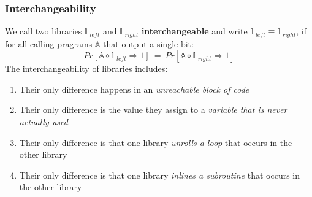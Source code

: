\documentclass{article}
\begin{document}
\begin{adjustwidth}{2em}{}
\begin{adjustwidth}{2em}{}
				\subsubsection{Interchangeability}
				\begin{adjustwidth}{2em}{4em}
					We call two libraries $\mathbb{L}_{left}$ and $\mathbb{L}_{right}$ \textbf{interchangeable} and write $\mathbb{L}_{left} \equiv \mathbb{L}_{right}$, if for all calling pragrams $\mathbb{A}$ that output a single bit:
					\[
						Pr[\mathbb{A} \diamond \mathbb{L}_{left} \Rightarrow 1] \ = \ Pr[\mathbb{A} \diamond \mathbb{L}_{right} \Rightarrow 1]
					\]
					The interchangeability of libraries includes:
					\begin{adjustwidth}{1em}{}
						\begin{enumerate}[-]
							\item Their only difference happens in an \textit{unreachable block of code}
							\item Their only difference is the value they assign to a \textit{variable that is never actually used}
							\item Their only difference is that one library \textit{unrolls a loop} that occurs in the other library
							\item Their only difference is that one library \textit{inlines a subroutine} that occurs in the other library
						\end{enumerate}
					\end{adjustwidth}
				\end{adjustwidth}

\end{adjustwidth}
\end{adjustwidth}
\end{document}

